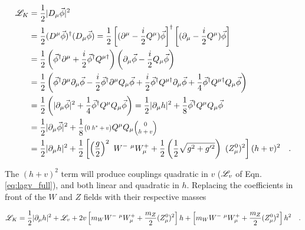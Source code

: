     \begin{equation} \begin{split}
        \Lag_K &= \frac{1}{2} |D_{\mu} \vec{\phi}|^2
            \\&= \frac{1}{2} (D^{\mu} \vec{\phi})^\dag (D_{\mu} \vec{\phi})
                = \frac{1}{2} \left[(\partial^{\mu} - \frac{i}{2}Q^{\mu}) \vec{\phi}\right]^\dag
                \left[(\partial_{\mu} - \frac{i}{2}Q^{\mu}) \vec{\phi}\right]
            \\&= \frac{1}{2} \left(\vec{\phi}^\dag \partial^{\mu} + \frac{i}{2} \vec{\phi}^\dag Q^{\mu \dag} \right)
                \left(\partial_{\mu}\vec{\phi} - \frac{i}{2}Q_{\mu}\vec{\phi} \right)
            \\&= \frac{1}{2} \left(
                \vec{\phi}^\dag \partial^{\mu} \partial_{\mu}\vec{\phi}
                - \frac{i}{2} \vec{\phi}^\dag \partial^{\mu} Q_{\mu}\vec{\phi}
                + \frac{i}{2} \vec{\phi}^\dag Q^{\mu \dag} \partial_{\mu}\vec{\phi}
                + \frac{1}{4} \vec{\phi}^\dag Q^{\mu \dag} Q_{\mu}\vec{\phi}
                \right)
            \\&= \frac{1}{2} \left(
                | \partial_{\mu}\vec{\phi} |^2
                + \frac{1}{4} \vec{\phi}^\dag Q^{\mu} Q_{\mu} \vec{\phi}
                \right)
                = \frac{1}{2} | \partial_{\mu}h |^2 + \frac{1}{8} \vec{\phi}^\dag Q^{\mu}Q_{\mu} \vec{\phi}
            \\&= \frac{1}{2} | \partial_{\mu}\vec{\phi} |^2 + \frac{1}{8} 
                    \minimatrix{0 & h^* + v} Q^{\mu}
                    Q_{\mu} \minimatrix{0 \\ h + v}
            \\&= \frac{1}{2} | \partial_{\mu}h |^2
                + \frac{1}{2} \left[ \left(\frac{g}{2}\right)^2\  W^{-\ \mu} W^+_{\mu}
                + \frac{1}{2} \left(\frac{1}{2}\sqrt{g^2 + g^{\prime 2}}\right)\ (Z^0_{\mu})^2 \right] (h+v)^2
        \quad.
    \end{split} \end{equation}

    The $(h+v)^2$ term will produce couplings quadratic in $v$ ($\mathscr{L}_v$ of Eqn. \ref{eq:lagv_full}), and both linear and quadratic in $h$.
    Replacing the coefficients in front of the $W$ and $Z$ fields with their respective masses

    \begin{equation} \begin{split}
        \mathscr{L}_K = \frac{1}{2} | \partial_{\mu}h |^2 + \mathscr{L}_v
            + 2v\left[ m_W W^{-\ \mu} W^+_{\mu} + \frac{m_Z}{2} (Z^0_{\mu})^2 \right] h
            + \left[ m_W W^{-\ \mu} W^+_{\mu} + \frac{m_Z}{2} (Z^0_{\mu})^2 \right] h^2
        \quad.
    \end{split} \end{equation}

